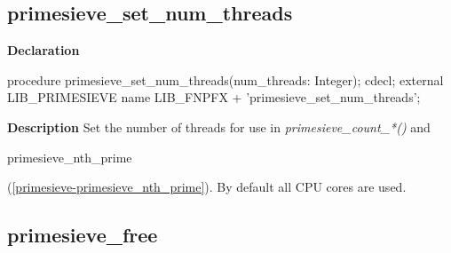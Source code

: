 \documentclass{report}
\newif\ifpdf
\begin{document}
\subsection*{primesieve{\_}set{\_}num{\_}threads}
\fi
\label{primesieve-primesieve_set_num_threads}
\begin{list}{}{
\setlength{\itemindent}{0cm}
\setlength{\listparindent}{0cm}
\setlength{\leftmargin}{\evensidemargin}
\addtolength{\leftmargin}{\tmplength}
\settowidth{\labelsep}{X}
\addtolength{\leftmargin}{\labelsep}
\setlength{\labelwidth}{\tmplength}
}
\item[\textbf{Declaration}\hfill]
\ifpdf
\begin{flushleft}
\fi
\begin{ttfamily}
procedure primesieve{\_}set{\_}num{\_}threads(num{\_}threads: Integer); cdecl; external LIB{\_}PRIMESIEVE name LIB{\_}FNPFX + 'primesieve{\_}set{\_}num{\_}threads';\end{ttfamily}

\ifpdf
\end{flushleft}
\fi

\par
\item[\textbf{Description}]
Set the number of threads for use in \textit{primesieve{\_}count{\_}*()} and \begin{ttfamily}primesieve{\_}nth{\_}prime\end{ttfamily}(\ref{primesieve-primesieve_nth_prime}). By default all CPU cores are used.

\end{list}
\ifpdf
\subsection*{\large{\textbf{primesieve{\_}free}}\normalsize\hspace{1ex}\hrulefill}
\else
\end{document}
